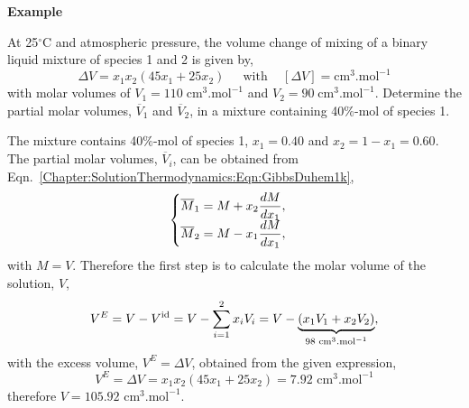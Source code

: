    \begin{MyExample}{\begin{center}{\bf Example}\end{center}}
     \begin{example}\label{Chapter:SolutionThermodynamics:Example3}
           At 25$^{\circ}$C and atmospheric pressure, the volume change of mixing of a binary liquid mixture of species 1 and 2 is given by,
       \begin{displaymath}
          \Delta V = x_{1}x_{2}\left(45x_{1}+25x_{2}\right)\;\;\;\;\text{ with }\;\;\;\left[\Delta V\right] = \text{cm}^{3}.\text{mol}^{-1}
       \end{displaymath}
       with molar volumes of $V_{1} = 110\;\text{cm}^{3}.\text{mol}^{-1}$ and $V_{2} = 90\;\text{cm}^{3}.\text{mol}^{-1}$. Determine the partial molar volumes, $\overline{V}_{1}$ and $\overline{V}_{2}$, in a mixture containing 40$\%$-mol of species 1.
     \end{example}

          The mixture contains 40$\%$-mol of species 1, \ie $x_{1}=0.40$ and $x_{2}=1-x_{1}=0.60$. The partial molar volumes, $\overline{V}_{i}$, can be obtained from Eqn.~\ref{Chapter:SolutionThermodynamics:Eqn:GibbsDuhem1k}, 
               \begin{displaymath}
                 \begin{cases}
                    \overline{M}_{1} = M + x_{2}\frc{dM}{dx_{1}},\\
                    \overline{M}_{2} = M - x_{1}\frc{dM}{dx_{1}},
                 \end{cases}
              \end{displaymath}
              with $M=V$. Therefore the first step is to calculate the molar volume of the solution, $V$,
                 \begin{displaymath}
                    V^{E} = V - V^{\text{id}} = V - \summation[x_{i}V_{i}]{i=1}{2} = V - \underbrace{\left(x_{1}V_{1} + x_{2}V_{2}\right)}_{98\text{ cm}^{3}.\text{mol}^{-1}},
                 \end{displaymath}
              with the excess volume, $V^{E}=\Delta V$, obtained from the given expression,
                 \begin{displaymath}
                    V^{E} = \Delta V = x_{1}x_{2}\left(45x_{1}+25x_{2}\right) = 7.92\text{ cm}^{3}.\text{mol}^{-1}
                 \end{displaymath}
              therefore $V=105.92\text{ cm}^{3}.\text{mol}^{-1}$.
\medskip


\end{MyExample}
